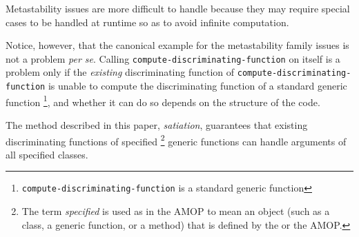 Metastability issues are more difficult to handle because they may
require special cases to be handled at runtime so as to avoid infinite
computation.  

Notice, however, that the canonical example for the
metastability family issues is not a problem \emph{per se}.  Calling
\texttt{compute-discriminating-function} on itself is a problem only
if the \emph{existing} discriminating function of
\texttt{compute-discriminating-function} is unable to compute the
discriminating function of a standard generic function%
\footnote{\texttt{compute-discriminating-function} is a standard
  generic function}, and whether it can do so depends on the structure
of the code.

The method described in this paper, \emph{satiation}, guarantees that
existing discriminating functions of specified%
\footnote{The term \emph{specified} is used as in the AMOP to mean
  an object (such as a class, a generic function, or a method) that is
  defined by the \hs{} or the AMOP.}
generic functions can handle arguments of all specified classes.
